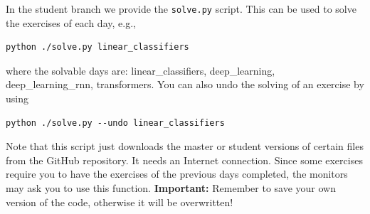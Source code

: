 In the student branch we provide the \verb+solve.py+ script. This can be used
to solve the exercises of each day, e.g.,

\begin{verbatim}
python ./solve.py linear_classifiers
\end{verbatim}

\noindent where the solvable days are: linear\_classifiers, deep\_learning, deep\_learning\_rnn, transformers. You can also undo the solving of an exercise by using

\begin{verbatim}
python ./solve.py --undo linear_classifiers
\end{verbatim}

Note that this script just downloads the master or student versions of certain files from the GitHub repository. It needs an Internet connection. Since some exercises require you to have the exercises of the previous days completed, the monitors may ask you to use this function. \textbf{Important:} Remember to save your own version of the code, otherwise it will be overwritten!
